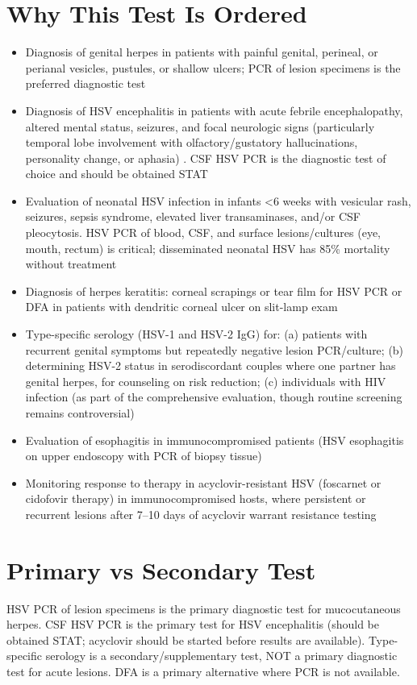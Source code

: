 \section*{Why This Test Is Ordered}
\begin{itemize}
  \item Diagnosis of genital herpes in patients with painful genital, perineal, or perianal vesicles, pustules, or shallow ulcers; PCR of lesion specimens is the preferred diagnostic test
  \item Diagnosis of HSV encephalitis in patients with acute febrile encephalopathy, altered mental status, seizures, and focal neurologic signs (particularly temporal lobe involvement with olfactory/gustatory hallucinations, personality change, or aphasia) \cite{tunkel2008management}. CSF HSV PCR is the diagnostic test of choice and should be obtained STAT
  \item Evaluation of neonatal HSV infection in infants <6 weeks with vesicular rash, seizures, sepsis syndrome, elevated liver transaminases, and/or CSF pleocytosis. HSV PCR of blood, CSF, and surface lesions/cultures (eye, mouth, rectum) is critical; disseminated neonatal HSV has 85\% mortality without treatment
  \item Diagnosis of herpes keratitis: corneal scrapings or tear film for HSV PCR or DFA in patients with dendritic corneal ulcer on slit-lamp exam
  \item Type-specific serology (HSV-1 and HSV-2 IgG) for: (a) patients with recurrent genital symptoms but repeatedly negative lesion PCR/culture; (b) determining HSV-2 status in serodiscordant couples where one partner has genital herpes, for counseling on risk reduction; (c) individuals with HIV infection (as part of the comprehensive evaluation, though routine screening remains controversial)
  \item Evaluation of esophagitis in immunocompromised patients (HSV esophagitis on upper endoscopy with PCR of biopsy tissue)
  \item Monitoring response to therapy in acyclovir-resistant HSV (foscarnet or cidofovir therapy) in immunocompromised hosts, where persistent or recurrent lesions after 7--10 days of acyclovir warrant resistance testing
\end{itemize}

\section*{Primary vs Secondary Test}
HSV PCR of lesion specimens is the primary diagnostic test for mucocutaneous herpes. CSF HSV PCR is the primary test for HSV encephalitis (should be obtained STAT; acyclovir should be started before results are available). Type-specific serology is a secondary/supplementary test, NOT a primary diagnostic test for acute lesions. DFA is a primary alternative where PCR is not available.


